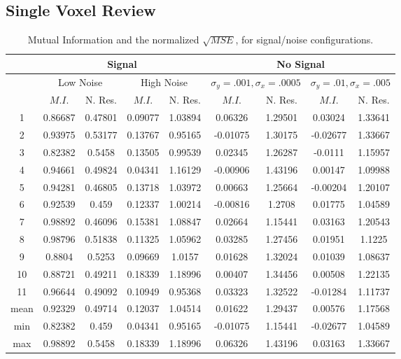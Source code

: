 \subsection{Single Voxel Review}
\label{sec:SingleVoxelReview}
\begin{table}[t]
\centering
\begin{tabular}{|c | c | c | c | c | c | c | c | c |}
\hline 
& \multicolumn{4}{|c|}{Signal} & \multicolumn{4}{|c|}{No Signal}\\
\hline
& \multicolumn{2}{|c|}{Low Noise} & \multicolumn{2}{|c|}{High Noise} 
& \multicolumn{2}{|c|}{$\sigma_y = .001, \sigma_x = .0005$} 
& \multicolumn{2}{|c|}{$\sigma_y = .01, \sigma_x = .005$}\\
\hline 
& $M.I.$ & N. Res. &
  $M.I.$ & N. Res. &
  $M.I.$ & N. Res. &
  $M.I.$ & N. Res. \\
\hline       
\hline       
1 &   0.86687  &0.47801 &  0.09077  &1.03894 &  0.06326  &  1.29501 & 0.03024  &1.33641 \\
2 &   0.93975  &0.53177 &  0.13767  &0.95165 &  -0.01075  & 1.30175 & -0.02677 &1.33667 \\
3 &   0.82382  &0.5458  &  0.13505  &0.99539 &  0.02345  &  1.26287 & -0.0111  &1.15957 \\
4 &   0.94661  &0.49824 &  0.04341  &1.16129 &  -0.00906  & 1.43196 & 0.00147  &1.09988 \\
5 &   0.94281  &0.46805 &  0.13718  &1.03972 &  0.00663  &  1.25664 & -0.00204 &1.20107 \\
6 &   0.92539  &0.459   &  0.12337  &1.00214 &  -0.00816  & 1.2708 &  0.01775  &1.04589 \\
7 &   0.98892  &0.46096 &  0.15381  &1.08847 &  0.02664  &  1.15441 & 0.03163  &1.20543 \\
8 &   0.98796  &0.51838 &  0.11325  &1.05962 &  0.03285  &  1.27456 & 0.01951  &1.1225 \\
9 &   0.8804   &0.5253  &  0.09669  &1.0157  &  0.01628  &  1.32024 & 0.01039  &1.08637 \\
10 &  0.88721   &0.49211 & 0.18339  &1.18996 &  0.00407  &  1.34456 & 0.00508  &1.22135 \\
11 &  0.96644   &0.49092 & 0.10949  &0.95368 &  0.03323  &  1.32522 & -0.01284 &1.11737 \\
\hline                                                                         
mean &0.92329  &0.49714 & 0.12037   &1.04514 &  0.01622  &  1.29437 & 0.00576  &1.17568 \\
\hline                                                                           
min &  0.82382  &0.459   &  0.04341  &0.95165 & -0.01075  & 1.15441 & -0.02677 &1.04589 \\
\hline                                                                         
max &  0.98892  &0.5458  & 0.18339   &1.18996 & 0.06326  &  1.43196 & 0.03163  &1.33667 \\
\hline
\end{tabular}
\caption{Mutual Information and the normalized $\sqrt{MSE}$, 
    for signal/noise configurations.}
\label{tab:SignleVoxelActivationComparison} 
\end{table}

